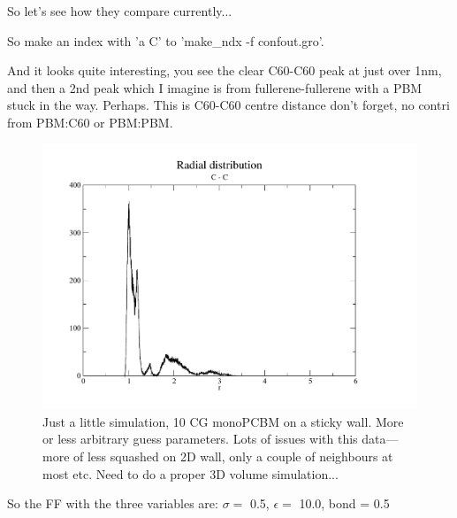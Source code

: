 \documentclass[hyperref]{labbook}
\begin{document}

So let's see how they compare currently...


So make an index with 'a C' to 'make\_ndx -f confout.gro'.

And it looks quite interesting, you see the clear C60-C60 peak at just over
1nm, and then a 2nd peak which I imagine is from fullerene-fullerene with a PBM
stuck in the way. Perhaps. This is C60-C60 centre distance don't forget, no
contri from PBM:C60 or PBM:PBM.

\begin{figure}[h!]
\centering
\includegraphics[width=0.8\columnwidth,angle=270]{./figs/CG-RDF-early_work}
\caption{\label{CG-RDF-early_work}
Just a little simulation, 10 CG monoPCBM on a sticky wall. More or less
arbitrary guess parameters.  Lots of issues with this data---more of less
squashed on 2D wall, only a couple of neighbours at most etc. Need to do a
proper 3D volume simulation...
}
\end{figure}


So the FF with the three variables are: $\sigma=$ 0.5, $\epsilon=$ 10.0, bond = 0.5
\end{document}
